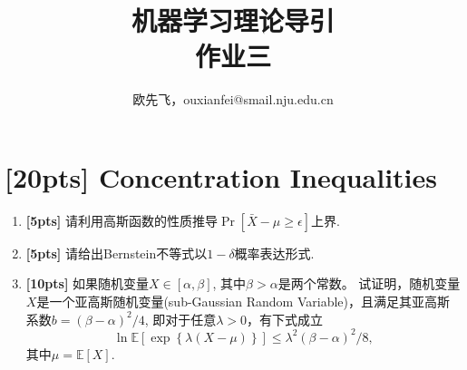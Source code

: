 \documentclass[a4paper,UTF8]{article}
\numberwithin{equation}{section}
\begin{document}
\allowdisplaybreaks
\renewcommand{\tilde}{\widetilde}
\renewcommand{\hat}{\widehat}
	\title{机器学习理论导引\\
		作业三}
	\author{欧先飞，ouxianfei@smail.nju.edu.cn}
	\maketitle

\section{[20pts] Concentration Inequalities}
	\begin{enumerate}[(1)]
		\item \textbf{[5pts]}  请利用高斯函数的性质推导$\Pr[\bar{X}-\mu\geq\epsilon]$上界.
		
		\item \textbf{[5pts]}  请给出Bernstein不等式以$1-\delta$概率表达形式.
		
		\item \textbf{[10pts]} 如果随机变量$X\in[\alpha,\beta]$, 其中$\beta > \alpha$是两个常数。 试证明，随机变量$X$是一个亚高斯随机变量(sub-Gaussian Random Variable)，且满足其亚高斯系数$b=(\beta-\alpha)^2/4$, 即对于任意$\lambda > 0$，有下式成立
		\begin{equation}
			\label{eq:def-subgaussian}
			\ln \mathbb{E}[\exp\left\{\lambda (X-\mu) \right\}] \leq \lambda^2(\beta-\alpha)^2/8,
		\end{equation}
		其中$\mu = \mathbb{E}[X]$.		
	\end{enumerate}
\end{document}
